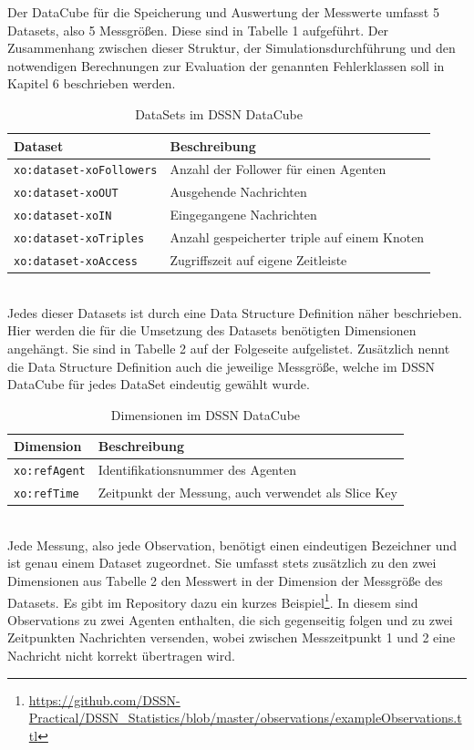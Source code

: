 \documentclass{article}
\begin{document}
Der DataCube für die Speicherung und Auswertung der Messwerte umfasst 5 Datasets, also 5 Messgrößen. Diese sind in Tabelle 1 aufgeführt. Der Zusammenhang zwischen dieser Struktur, der Simulationsdurchführung und den notwendigen Berechnungen zur Evaluation der genannten Fehlerklassen soll in Kapitel 6 beschrieben werden.\\
\begin{table}[ht]
\centering
\label{table1}
\begin{tabular}{|l|l|}
\hline
Dataset & Beschreibung \\ \hline
\texttt{xo:dataset-xoFollowers}       & Anzahl der Follower für einen Agenten            	\\ \hline
\texttt{xo:dataset-xoOUT}        & Ausgehende Nachrichten         \\ \hline
\texttt{xo:dataset-xoIN}        & Eingegangene Nachrichten             						\\ \hline
\texttt{xo:dataset-xoTriples}        & Anzahl gespeicherter triple auf einem Knoten        	\\ \hline
\texttt{xo:dataset-xoAccess}        & Zugriffszeit auf eigene Zeitleiste             		\\ \hline
\end{tabular}
\caption{DataSets im DSSN DataCube}
\end{table}\\
Jedes dieser Datasets ist durch eine Data Structure Definition näher beschrieben. Hier werden die für die Umsetzung des Datasets benötigten Dimensionen angehängt. Sie sind in Tabelle 2 auf der Folgeseite aufgelistet. Zusätzlich nennt die Data Structure Definition auch die jeweilige Messgröße, welche im DSSN DataCube für jedes DataSet eindeutig gewählt wurde.
\begin{table}[t]
\centering
\label{table2}
\begin{tabular}{|l|l|}
\hline
Dimension & Beschreibung \\ \hline
\texttt{xo:refAgent}       & Identifikationsnummer des Agenten            			\\ \hline
\texttt{xo:refTime}        & Zeitpunkt der Messung, auch verwendet als Slice Key	\\ \hline
\end{tabular}
\caption{Dimensionen im DSSN DataCube}
\end{table}\\
Jede Messung, also jede Observation, benötigt einen eindeutigen Bezeichner und ist genau einem Dataset zugeordnet. Sie umfasst stets zusätzlich zu den zwei Dimensionen aus Tabelle 2 den Messwert in der Dimension der Messgröße des Datasets. Es gibt im Repository dazu ein kurzes Beispiel\footnote{\url{https://github.com/DSSN-Practical/DSSN_Statistics/blob/master/observations/exampleObservations.ttl}}. In diesem sind Observations zu zwei Agenten enthalten, die sich gegenseitig folgen und zu zwei Zeitpunkten Nachrichten versenden, wobei zwischen Messzeitpunkt 1 und 2 eine Nachricht nicht korrekt übertragen wird.
\end{document}
